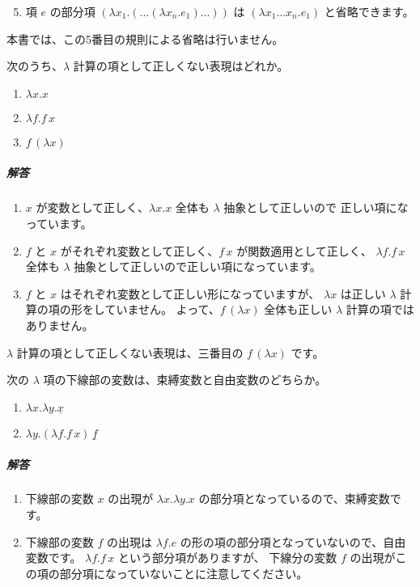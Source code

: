 \begin{enumerate}
  \setcounter{enumi}{4}
  \item 項 $e$ の部分項 $(\lambda x_1. (\dots (\lambda x_n . e_1) \dots))$ は
        $(\lambda x_1 \dots x_n . e_1)$ と省略できます。
\end{enumerate}

本書では、この5番目の規則による省略は行いません。

\begin{exercise}

次のうち、$\lambda$ 計算の項として正しくない表現はどれか。

\begin{enumerate}
  \item $\lambda x . x$
  \item $\lambda f . f \, x$
  \item $f \, (\lambda x)$
\end{enumerate}

\subparagraph{解答}

\begin{enumerate}
  \item $x$ が変数として正しく、$\lambda x . x$ 全体も $\lambda$ 抽象として正しいので
        正しい項になっています。
  \item $f$ と $x$ がそれぞれ変数として正しく、$f \, x$ が関数適用として正しく、
        $\lambda f . f \, x$ 全体も $\lambda$ 抽象として正しいので正しい項になっています。
  \item $f$ と $x$ はそれぞれ変数として正しい形になっていますが、
        $\lambda x$ は正しい $\lambda$ 計算の項の形をしていません。
        よって、$f \, (\lambda x)$ 全体も正しい $\lambda$ 計算の項ではありません。
\end{enumerate}

$\lambda$ 計算の項として正しくない表現は、三番目の $f \, (\lambda x)$ です。

\end{exercise}

\begin{exercise}

次の $\lambda$ 項の下線部の変数は、束縛変数と自由変数のどちらか。

\begin{enumerate}
  \item $\lambda x . \lambda y . \underline{x}$
  \item $\lambda y . (\lambda f . f \, x) \, \underline{f}$
\end{enumerate}

\subparagraph{解答}

\begin{enumerate}
  \item 下線部の変数 $x$ の出現が $\lambda x . \lambda y . x$ の部分項となっているので、束縛変数です。
  \item 下線部の変数 $f$ の出現は $\lambda f . e$ の形の項の部分項となっていないので、自由変数です。
        $\lambda f . f \, x$ という部分項がありますが、
        下線分の変数 $f$ の出現がこの項の部分項になっていないことに注意してください。
\end{enumerate}

\end{exercise}

